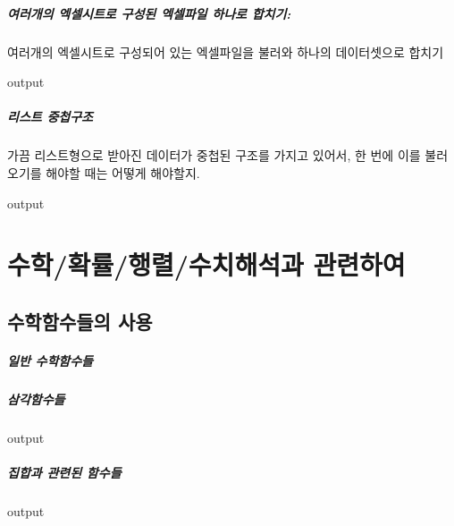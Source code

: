 \documentclass{book}
\begin{document}
\paragraph{여러개의 엑셀시트로 구성된 엑셀파일 하나로 합치기:} 여러개의 엑셀시트로 구성되어 있는 엑셀파일을 불러와 하나의 데이터셋으로 합치기
\begin{Schunk}
\begin{Soutput}
output
\end{Soutput}
\end{Schunk}

\paragraph{리스트 중첩구조} 
가끔 리스트형으로 받아진 데이터가 중첩된 구조를 가지고 있어서, 한 번에 이를 불러오기를 해야할 때는 어떻게 해야할지.
\begin{Schunk}
\begin{Soutput}
output
\end{Soutput}
\end{Schunk}



%
%
%

\chapter{수학/확률/행렬/수치해석과 관련하여}

\section{수학함수들의 사용}

\paragraph{일반 수학함수들}

\paragraph{삼각함수들}
\begin{Schunk}
\begin{Soutput}
output
\end{Soutput}
\end{Schunk}
\paragraph{집합과 관련된 함수들}
\begin{Schunk}
\begin{Soutput}
output
\end{Soutput}
\end{Schunk}
\end{document}
